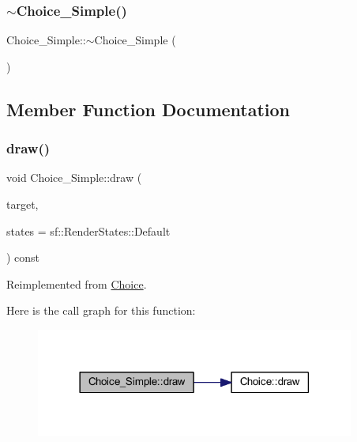 \mbox{\label{class_choice___simple_a6d5b3fe8aa2969f8eaffa4e5fd3b47d9}} 
\subsubsection{\texorpdfstring{$\sim$\+Choice\+\_\+\+Simple()}{~Choice\_Simple()}}
{\footnotesize\ttfamily Choice\+\_\+\+Simple\+::$\sim$\+Choice\+\_\+\+Simple (\begin{DoxyParamCaption}{ }\end{DoxyParamCaption})\hspace{0.3cm}{\ttfamily [virtual]}}



\subsection{Member Function Documentation}
\mbox{\label{class_choice___simple_ae8f4cedc34a10d3c35efce8cec1bec54}} 
\subsubsection{\texorpdfstring{draw()}{draw()}}
{\footnotesize\ttfamily void Choice\+\_\+\+Simple\+::draw (\begin{DoxyParamCaption}\item[{sf\+::\+Render\+Target \&}]{target,  }\item[{sf\+::\+Render\+States}]{states = {\ttfamily sf\+:\+:RenderStates\+:\+:Default} }\end{DoxyParamCaption}) const\hspace{0.3cm}{\ttfamily [virtual]}}



Reimplemented from \hyperlink{class_choice_ad6a03ce8c892eacabef3691feba37b0f}{Choice}.

Here is the call graph for this function\+:\nopagebreak
\begin{figure}[H]
\begin{center}
\leavevmode
\includegraphics[width=297pt]{class_choice___simple_ae8f4cedc34a10d3c35efce8cec1bec54_cgraph}
\end{center}
\end{figure}
\mbox{\label{class_choice___simple_a035e32f90e4561b666b6571bce06e207}} 
